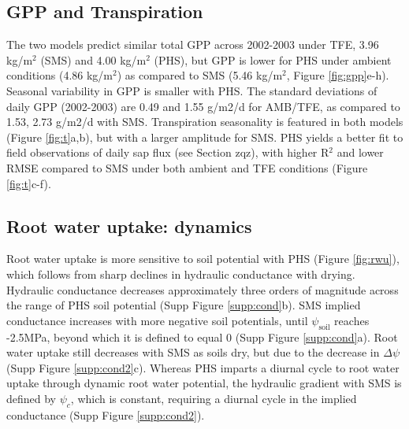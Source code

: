\documentclass[draft,linenumbers]{agujournal}
\begin{document}
\subsection{GPP and Transpiration}
    The two models predict similar total GPP across 2002-2003 under TFE, 3.96 kg/m$^2$ (SMS) and 4.00 kg/m$^2$ (PHS), 
    but GPP is lower for PHS under ambient conditions (4.86 kg/m$^2$) as compared to SMS (5.46 kg/m$^2$, Figure \ref{fig:gpp}e-h).
    Seasonal variability in GPP is smaller with PHS. 
    The standard deviations of daily GPP (2002-2003) are 0.49 and 1.55 g/m2/d for AMB/TFE, 
    as compared to 1.53, 2.73 g/m2/d with SMS. 
    Transpiration seasonality is featured in both models (Figure \ref{fig:t}a,b), but with a larger amplitude for SMS.
    PHS yields a better fit to field observations of daily sap flux (see Section zqz), with higher R$^2$ and lower RMSE compared to SMS 
    under both ambient and TFE conditions (Figure \ref{fig:t}c-f).

    
\subsection{Root water uptake: dynamics}
    Root water uptake is more sensitive to soil potential with PHS (Figure \ref{fig:rwu}),
    which follows from sharp declines in hydraulic conductance with drying.
    Hydraulic conductance decreases approximately three orders of magnitude across the range of PHS soil potential (Supp Figure \ref{supp:cond}b).
    SMS implied conductance increases with more negative soil potentials, until $\psi_{\text{soil}}$ reaches -2.5MPa, beyond which it is defined to equal 0 (Supp Figure \ref{supp:cond}a).
    Root water uptake still decreases with SMS as soils dry, but due to the decrease in $\Delta\psi$ (Supp Figure \ref{supp:cond2}c).
    Whereas PHS imparts a diurnal cycle to root water uptake through dynamic root water potential, 
    the hydraulic gradient with SMS is defined by $\psi_c$, which is constant, requiring a diurnal cycle in the implied conductance (Supp Figure \ref{supp:cond2}).
    
\end{document}
